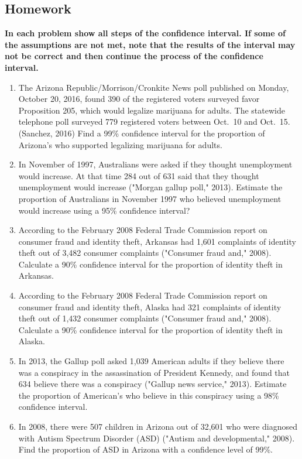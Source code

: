 \documentclass[
]{book}
\begin{document}
\hypertarget{homework-20}{%
\subsection{Homework}\label{homework-20}}

\textbf{In each problem show all steps of the confidence interval. If some of the assumptions are not met, note that the results of the interval may not be correct and then continue the process of the confidence interval.}

\begin{enumerate}
\def\labelenumi{\arabic{enumi}.}
\item
  The Arizona Republic/Morrison/Cronkite News poll published on Monday, October 20, 2016, found 390 of the registered voters surveyed favor Proposition 205, which would legalize marijuana for adults. The statewide telephone poll surveyed 779 registered voters between Oct.~10 and Oct.~15. (Sanchez, 2016) Find a 99\% confidence interval for the proportion of Arizona's who supported legalizing marijuana for adults.
\item
  In November of 1997, Australians were asked if they thought unemployment would increase. At that time 284 out of 631 said that they thought unemployment would increase ("Morgan gallup poll," 2013). Estimate the proportion of Australians in November 1997 who believed unemployment would increase using a 95\% confidence interval?
\item
  According to the February 2008 Federal Trade Commission report on consumer fraud and identity theft, Arkansas had 1,601 complaints of identity theft out of 3,482 consumer complaints ("Consumer fraud and," 2008). Calculate a 90\% confidence interval for the proportion of identity theft in Arkansas.
\item
  According to the February 2008 Federal Trade Commission report on consumer fraud and identity theft, Alaska had 321 complaints of identity theft out of 1,432 consumer complaints ("Consumer fraud and," 2008). Calculate a 90\% confidence interval for the proportion of identity theft in Alaska.
\item
  In 2013, the Gallup poll asked 1,039 American adults if they believe there was a conspiracy in the assassination of President Kennedy, and found that 634 believe there was a conspiracy ("Gallup news service," 2013). Estimate the proportion of American's who believe in this conspiracy using a 98\% confidence interval.
\item
  In 2008, there were 507 children in Arizona out of 32,601 who were diagnosed with Autism Spectrum Disorder (ASD) ("Autism and developmental," 2008). Find the proportion of ASD in Arizona with a confidence level of 99\%.
\end{enumerate}
\end{document}
